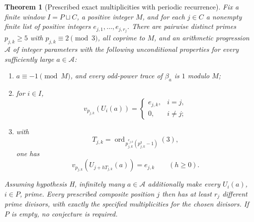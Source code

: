 \documentclass[11pt,a4paper]{article}
\newtheorem{theorem}{Theorem}[section]
\theoremstyle{remark}\newtheorem{remark}[theorem]{Remark}
\begin{document}
\begin{theorem}[Prescribed exact multiplicities with periodic recurrence]
\label{fac:valuationpatterns}
Fix a finite window $I=P\sqcup C$, a positive integer $M$, and for each
$j\in C$ a nonempty finite list of positive integers
$e_{j,1},\ldots,e_{j,r_j}$. There are pairwise distinct primes
$p_{j,k}\ge5$ with $p_{j,k}\equiv2\pmod3$, all coprime to $M$, and an arithmetic progression
$\mathcal A$ of integer parameters with the following unconditional
properties for every sufficiently large $a\in\mathcal A$:
\begin{enumerate}
\item $a\equiv-1\pmod M$, and every odd-power trace of $\beta_a$ is
$1$ modulo $M$;
\item for $i\in I$,
\[
 v_{p_{j,k}}(U_i(a))=
 \begin{cases}e_{j,k},&i=j,\\0,&i\ne j;\end{cases}
\]
\item with
\[
 T_{j,k}=\operatorname{ord}_{\,p_{j,k}^{e_{j,k}}
                      (p_{j,k}^3-1)}(3),
\]
one has
\[
 v_{p_{j,k}}(U_{j+hT_{j,k}}(a))=e_{j,k}\qquad(h\ge0).
\]
\end{enumerate}
Assuming hypothesis H, infinitely many $a\in\mathcal A$ additionally
make every $U_i(a)$, $i\in P$, prime. Every prescribed composite position
$j$ then has at least $r_j$ different prime divisors, with exactly the
specified multiplicities for the chosen divisors. If $P$ is empty,
no conjecture is required.
\end{theorem}
\end{document}
